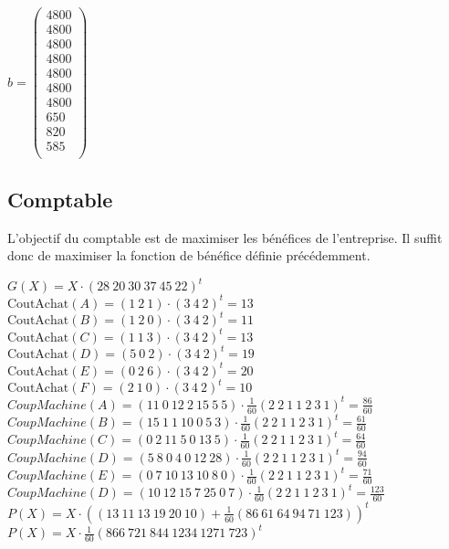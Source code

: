 \documentclass[a4paper, 11pt]{article}
\begin{document}
$b = \begin{pmatrix}
4800\\
4800\\
4800\\
4800\\
4800\\
4800\\
4800\\
650\\
820\\
585\\
\end{pmatrix}$


\subsection{Comptable}
L'objectif du comptable est de maximiser les bénéfices de l'entreprise.
Il suffit donc de maximiser la fonction de bénéfice définie précédemment.

$G(X) = X\cdot(28~20~30~37~45~22)^t$ \\

$\mbox{CoutAchat}(A) = (1~2~1)\cdot(3~4~2)^t = 13$ \\
$\mbox{CoutAchat}(B) = (1~2~0)\cdot(3~4~2)^t = 11$ \\
$\mbox{CoutAchat}(C) = (1~1~3)\cdot(3~4~2)^t = 13$ \\
$\mbox{CoutAchat}(D) = (5~0~2)\cdot(3~4~2)^t = 19$ \\
$\mbox{CoutAchat}(E) = (0~2~6)\cdot(3~4~2)^t = 20$ \\
$\mbox{CoutAchat}(F) = (2~1~0)\cdot(3~4~2)^t = 10$ \\


$CoupMachine(A) = (11~0~12~2~15~5~5)\cdot\frac{1}{60}(2~2~1~1~2~3~1)^t = \frac{86}{60}$ \\
$CoupMachine(B) = (15~1~1~10~0~5~3)\cdot\frac{1}{60}(2~2~1~1~2~3~1)^t = \frac{61}{60}$ \\
$CoupMachine(C) = (0~2~11~5~0~13~5)\cdot\frac{1}{60}(2~2~1~1~2~3~1)^t = \frac{64}{60}$ \\
$CoupMachine(D) = (5~8~0~4~0~12~28)\cdot\frac{1}{60}(2~2~1~1~2~3~1)^t = \frac{94}{60}$ \\
$CoupMachine(E) = (0~7~10~13~10~8~0)\cdot\frac{1}{60}(2~2~1~1~2~3~1)^t = \frac{71}{60}$ \\
$CoupMachine(D) = (10~12~15~7~25~0~7)\cdot\frac{1}{60}(2~2~1~1~2~3~1)^t = \frac{123}{60}$ \\

$P(X) = X\cdot\left((13~11~13~19~20~10) + \frac{1}{60}(86~61~64~94~71~123)\right)^t$ \\
$P(X) = X\cdot\frac{1}{60}(866~721~844~1234~1271~723)^t$ \\
\end{document}
